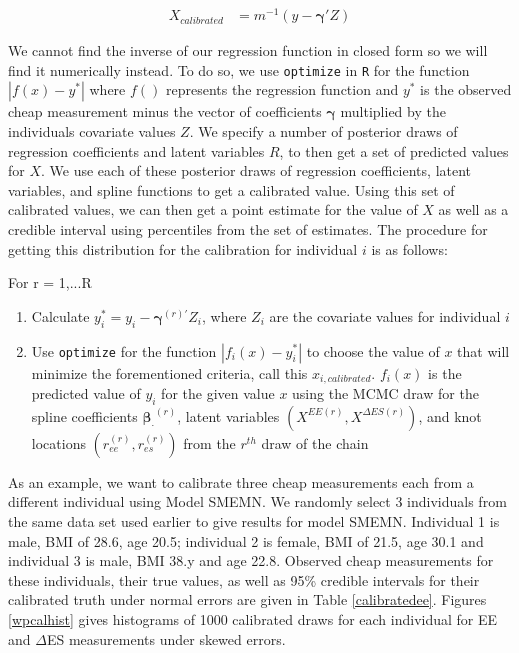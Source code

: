 \documentclass[11pt]{article}\usepackage[]{graphicx}\usepackage[]{color}
\begin{document}
\begin{align}
  X_{calibrated} &= m^{-1}(y-\boldsymbol{\gamma}' Z) 
\end{align}

We cannot find the inverse of our regression function in closed form so we will find it numerically instead. To do so, we use \texttt{optimize} in \texttt{R} for the function $|f(x)-y^*|$ where $f()$ represents the regression function and $y^*$ is the observed cheap measurement minus the vector of coefficients $\boldsymbol{\gamma}$ multiplied by the individuals covariate values $Z$. We specify a number of posterior draws of regression coefficients and latent variables $R$, to then get a set of predicted values for $X$. We use each of these posterior draws of regression coefficients, latent variables, and spline functions to get a calibrated value. Using this set of calibrated values, we can then get a point estimate for the value of $X$ as well as a credible interval using percentiles from the set of estimates. The procedure for getting this distribution for the calibration for individual $i$ is as follows:

For r = 1,...R
\begin{enumerate}
\item
Calculate $y_i^* = y_i- \boldsymbol{\gamma}^{(r)'} Z_i$, where $Z_i$ are the covariate values for individual $i$
\item
Use \texttt{optimize} for the function $|f_i(x) - y_i^*|$ to choose the value of $x$ that will minimize the forementioned criteria, call this $x_{i,calibrated}$. $f_i(x)$ is the predicted value of $y_i$ for the given value $x$ using the MCMC draw for the spline coefficients $\boldsymbol{\beta_{\cdot}}^{(r)}$, latent variables $({ X^{EE(r)},X^{\Delta ES (r)}})$, and knot locations $(r_{ee}^{(r)},r_{es}^{(r)})$ from the $r^{th}$ draw of the chain

\end{enumerate}


As an example, we want to calibrate three cheap measurements each from a different individual using Model SMEMN. We randomly select 3 individuals from the same data set used earlier to give results for model SMEMN. Individual 1 is male, BMI of 28.6, age 20.5; individual 2 is female, BMI of 21.5, age 30.1 and individual 3 is male, BMI 38.y and age 22.8. Observed cheap measurements for these individuals, their true values, as well as 95\% credible intervals for their calibrated truth under normal errors are given in Table \ref{calibratedee}. Figures \ref{wpcalhist} gives histograms of 1000 calibrated draws for each individual for EE and $\Delta$ES measurements under skewed errors. 
\end{document}

